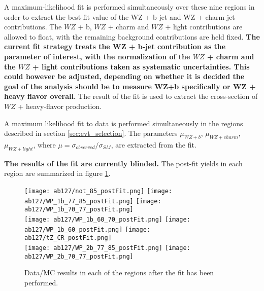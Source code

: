 
A maximum-likelihood fit is performed simultaneously over these nine regions in order to extract the best-fit value of the WZ + b-jet and WZ + charm jet contributions. The $WZ$ + b, $WZ$ + charm and $WZ$ + light contributions are allowed to float, with the remaining background contributions are held fixed. \textbf{The current fit strategy treats the WZ + b-jet contribution as the parameter of interest, with the normalization of the $WZ$ + charm and the $WZ$ + light contributions taken as systematic uncertainties. This could however be adjusted, depending on whether it is decided the goal of the analysis should be to measure WZ+b specifically or WZ + heavy flavor overall.} The result of the fit is used to extract the cross-section of $WZ$ + heavy-flavor production.

A maximum likelihood fit to data is performed simultaneously in the regions described in section \ref{sec:evt_selection}. The parameters $\mu_{WZ+b}$, $\mu_{WZ+charm}$, $\mu_{WZ+light}$, where $\mu = \sigma_{observed}/\sigma_{SM} $, are extracted from the fit.

\textbf{The results of the fit are currently blinded.} The post-fit yields in each region are summarized in figure \ref{fig:fit_regions}.

\begin{figure}
    \center
    \texttt{[image: ab127/not\_85\_postFit.png]}%
    \texttt{[image: ab127/WP\_1b\_77\_85\_postFit.png]}%
    \texttt{[image: ab127/WP\_1b\_70\_77\_postFit.png]}\\
    \texttt{[image: ab127/WP\_1b\_60\_70\_postFit.png]}%
    \texttt{[image: ab127/WP\_1b\_60\_postFit.png]}%
    \texttt{[image: ab127/tZ\_CR\_postFit.png]}\\
    \texttt{[image: ab127/WP\_2b\_77\_85\_postFit.png]}%
    \texttt{[image: ab127/WP\_2b\_70\_77\_postFit.png]}\\
    \caption{Data/MC results in each of the regions after the fit has been performed.}
    \label{fig:fit_regions}
\end{figure}

